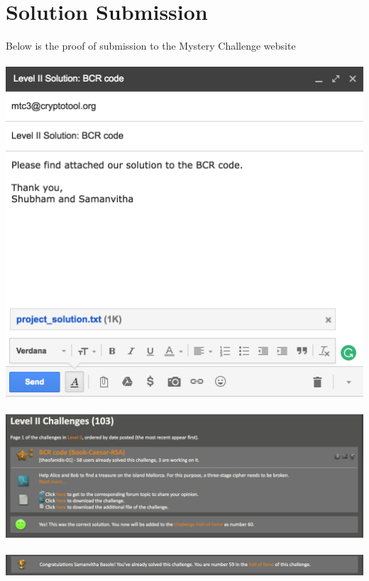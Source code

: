 \documentclass[12pt]{article}
\begin{document}
\section{Solution Submission}
Below is the proof of submission to the Mystery Challenge website \\ \\
\includegraphics[scale=0.8]{submission} \\ \\
\includegraphics[scale=0.5]{proof1} \\ \\
\includegraphics[scale=0.3]{proof2} \\ \\


\end{document}
